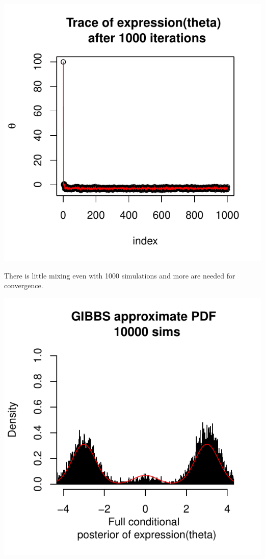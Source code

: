 \documentclass{article}\usepackage[]{graphicx}\usepackage[]{color}
\makeatletter
\def\maxwidth{ %
  \ifdim\Gin@nat@width>\linewidth
    \linewidth
  \else
    \Gin@nat@width
  \fi
}
\newenvironment{kframe}{%
 \def\at@end@of@kframe{}%
 \ifinner\ifhmode%
  \def\at@end@of@kframe{\end{minipage}}%
  \begin{minipage}{\columnwidth}%
 \fi\fi%
 \def\FrameCommand##1{\hskip\@totalleftmargin \hskip-\fboxsep
 \colorbox{shadecolor}{##1}\hskip-\fboxsep
     \hskip-\linewidth \hskip-\@totalleftmargin \hskip\columnwidth}%
 \MakeFramed {\advance\hsize-\width
   \@totalleftmargin\z@ \linewidth\hsize
   \@setminipage}}%
 {\par\unskip\endMakeFramed%
 \at@end@of@kframe}
\makeatother
\begin{document}
\begin{enumerate}
\includegraphics[width=\maxwidth]{figure/prob3e4-2} 


There is little mixing even with 1000 simulations and more are needed for convergence.

\begin{kframe}


{\ttfamily\noindent\bfseries\color{errorcolor}{\#\# Error in sample.int(length(x), size, replace, prob): NA in probability vector}}\end{kframe}
\includegraphics[width=\maxwidth]{figure/prob3e5-1} 


\end{enumerate}
\end{document}
